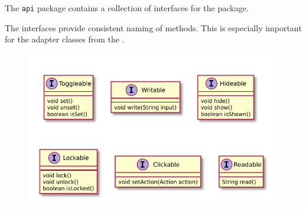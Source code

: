 The \texttt{api} package contains a collection of interfaces for the \texttt{} package.

The interfaces provide consistent naming of methods. This is especially important for the adapter classes from the
\texttt{}.

\begin{figure}[H]
	\centering
	\includegraphics[width=\textwidth]{packageDiagrams/apiPackage}
\end{figure}
